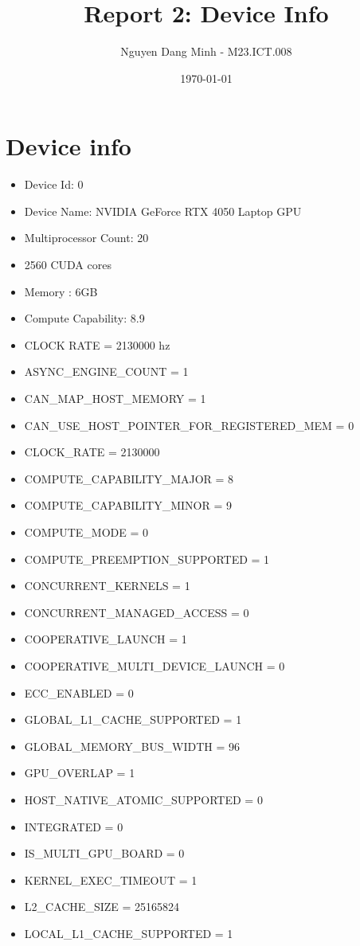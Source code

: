 \documentclass{article}
\title{Report 2: Device Info}
\author{Nguyen Dang Minh - M23.ICT.008}
\date{\today}
\begin{document}
\maketitle
\section{Device info}
\begin{itemize}
    \item Device Id: 0
    \item Device Name: NVIDIA GeForce RTX 4050 Laptop GPU
    \item Multiprocessor Count: 20
    \item 2560 CUDA cores
    \item Memory : 6GB
    \item Compute Capability: 8.9
    \item CLOCK RATE = 2130000 hz
    \item ASYNC\_ENGINE\_COUNT = 1
    \item CAN\_MAP\_HOST\_MEMORY = 1
    \item CAN\_USE\_HOST\_POINTER\_FOR\_REGISTERED\_MEM = 0
    \item CLOCK\_RATE = 2130000
    \item COMPUTE\_CAPABILITY\_MAJOR = 8
    \item COMPUTE\_CAPABILITY\_MINOR = 9
    \item COMPUTE\_MODE = 0
    \item COMPUTE\_PREEMPTION\_SUPPORTED = 1
    \item CONCURRENT\_KERNELS = 1
    \item CONCURRENT\_MANAGED\_ACCESS = 0
    \item COOPERATIVE\_LAUNCH = 1
    \item COOPERATIVE\_MULTI\_DEVICE\_LAUNCH = 0
    \item ECC\_ENABLED = 0
    \item GLOBAL\_L1\_CACHE\_SUPPORTED = 1
    \item GLOBAL\_MEMORY\_BUS\_WIDTH = 96
    \item GPU\_OVERLAP = 1
    \item HOST\_NATIVE\_ATOMIC\_SUPPORTED = 0
    \item INTEGRATED = 0
    \item IS\_MULTI\_GPU\_BOARD = 0
    \item KERNEL\_EXEC\_TIMEOUT = 1
    \item L2\_CACHE\_SIZE = 25165824
    \item LOCAL\_L1\_CACHE\_SUPPORTED = 1

\end{itemize}
\end{document}
